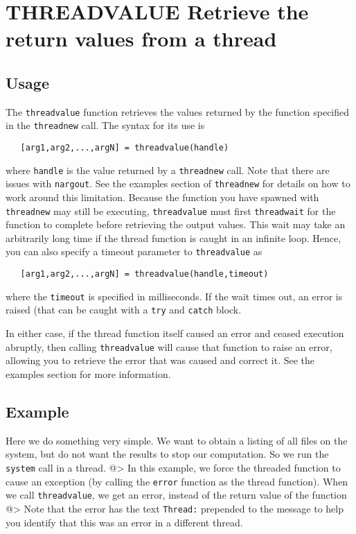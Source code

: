 \section{THREADVALUE Retrieve the return values from a thread}

\subsection{Usage}

The \verb|threadvalue| function retrieves the values returned
by the function specified in the \verb|threadnew| call.  The
syntax for its use is
\begin{verbatim}
   [arg1,arg2,...,argN] = threadvalue(handle)
\end{verbatim}
where \verb|handle| is the value returned by a \verb|threadnew| call.
Note that there are issues with \verb|nargout|.  See the examples
section of \verb|threadnew| for details on how to work around this
limitation.  Because the function you have spawned with \verb|threadnew|
may still be executing, \verb|threadvalue| must first \verb|threadwait|
for the function to complete before retrieving the output values.
This wait may take an arbitrarily long time if the thread function
is caught in an infinite loop.  Hence, you can also specify
a timeout parameter to \verb|threadvalue| as
\begin{verbatim}
   [arg1,arg2,...,argN] = threadvalue(handle,timeout)
\end{verbatim}
where the \verb|timeout| is specified in milliseconds.  If the
wait times out, an error is raised (that can be caught with a
\verb|try| and \verb|catch| block.  

In either case, if the thread function itself caused an error
and ceased execution abruptly, then calling \verb|threadvalue| will
cause that function to raise an error, allowing you to retrieve
the error that was caused and correct it.  See the examples section
for more information.
\subsection{Example}

Here we do something very simple.  We want to obtain a listing of
all files on the system, but do not want the results to stop our
computation.  So we run the \verb|system| call in a thread.
@>
In this example, we force the threaded function to cause an
exception (by calling the \verb|error| function as the thread 
function).  When we call \verb|threadvalue|, we get an error, instead
of the return value of the function
@>
Note that the error has the text \verb|Thread:| prepended to the message
to help you identify that this was an error in a different thread.
